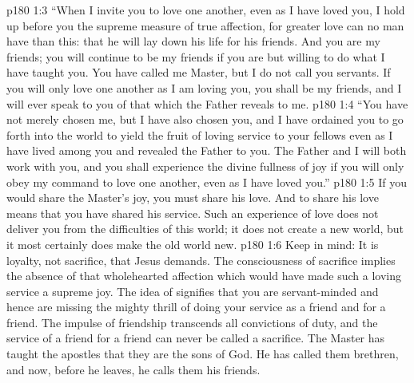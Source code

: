 \vs p180 1:3 \textcolor{ubdarkred}{“When I invite you to love one another, even as I have loved you, I hold up before you the supreme measure of true affection, for greater love can no man have than this: that he will lay down his life for his friends. And you are my friends; you will continue to be my friends if you are but willing to do what I have taught you. You have called me Master, but I do not call you servants. If you will only love one another as I am loving you, you shall be my friends, and I will ever speak to you of that which the Father reveals to me.}
\vs p180 1:4 \textcolor{ubdarkred}{“You have not merely chosen me, but I have also chosen you, and I have ordained you to go forth into the world to yield the fruit of loving service to your fellows even as I have lived among you and revealed the Father to you. The Father and I will both work with you, and you shall experience the divine fullness of joy if you will only obey my command to love one another, even as I have loved you.”}
\vs p180 1:5 \pc If you would share the Master’s joy, you must share his love. And to share his love means that you have shared his service. Such an experience of love does not deliver you from the difficulties of this world; it does not create a new world, but it most certainly does make the old world new.
\vs p180 1:6 Keep in mind: It is loyalty, not sacrifice, that Jesus demands. The consciousness of sacrifice implies the absence of that wholehearted affection which would have made such a loving service a supreme joy. The idea of  signifies that you are servant\hyp{}minded and hence are missing the mighty thrill of doing your service as a friend and for a friend. The impulse of friendship transcends all convictions of duty, and the service of a friend for a friend can never be called a sacrifice. The Master has taught the apostles that they are the sons of God. He has called them brethren, and now, before he leaves, he calls them his friends.
